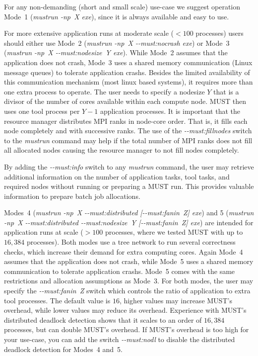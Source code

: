 \documentclass[english]{scrartcl}
\begin{document}
For any non-demanding (short and small scale) use-case we suggest operation 
Mode~1 (\emph{mustrun \mbox{-np X} exe}), since it is always available and easy to use.

For more extensive application runs at moderate scale ($<100$ processes) users
should either use Mode~2 (\emph{mustrun \mbox{-np X} \mbox{-{}-must:nocrash} exe}) or Mode~3
(\emph{mustrun \mbox{-np X} \mbox{-{}-must:nodesize Y} exe}). While Mode~2 assumes that the
application does not crash, Mode~3 uses a shared memory communication (Linux
message queues) to tolerate application crashs. Besides the limited availability
of this communication mechanism (most linux based systems), it requires more
than one extra process to operate. The user needs to specify a nodesize $Y$ that
is a divisor of the number of cores available within each compute node. MUST
then uses one tool process per $Y-1$ application processes. It is important that
the resource manager distributes MPI ranks in node-core order. That is, it fills
each node completely and with successive ranks. The use of the
\emph{\mbox{-{}-must:fillnodes}} switch to the \emph{mustrun} command may help if the
total number of MPI ranks does not fill all allocated nodes causing the
resource manager to not fill nodes completely.

By adding the \emph{\mbox{-{}-must:info}} switch to any \emph{mustrun} command, the user
may retrieve additional information on the number of application tasks, tool
tasks, and required nodes without running or preparing a MUST run. This provides
valuable information to prepare batch job allocations.

Modes~4 (\emph{mustrun \mbox{-np X} \mbox{-{}-must:distributed} [\mbox{-{}-must:fanin Z}] exe}) and 5
(\emph{mustrun \mbox{-np X} \mbox{-{}-must:distributed} \mbox{-{}-must:nodesize Y} [\mbox{-{}-must:fanin Z}] exe})
are intended for application runs at scale ($>100$ processes, where we
tested MUST with up to $16{,}384$ processes). Both modes use a tree network to
run several correctness checks, which increase their demand for extra computing
cores. Again Mode~4 assumes that the application does not crash, while Mode~5
uses a shared memory communication to tolerate application crashs. Mode~5 comes
with the same restrictions and allocation assumptions as Mode~3. For
both modes, the user may specify the \emph{\mbox{-{}-must:fanin Z}} switch which
controls the ratio of application to extra tool processes. The default
value is $16$, higher values may increase MUST's overhead, while lower
values may reduce its overhead. Experience with MUST's
distributed deadlock detection shows that it
scales to an order of $16{,}384$ processes, but can double
MUST's overhead. 
If MUST's overhead is too high for your use-case, you can add the switch
\emph{\mbox{-{}-must:nodl}} to disable the distributed deadlock detection for Modes~4 and~5. 
\end{document}
